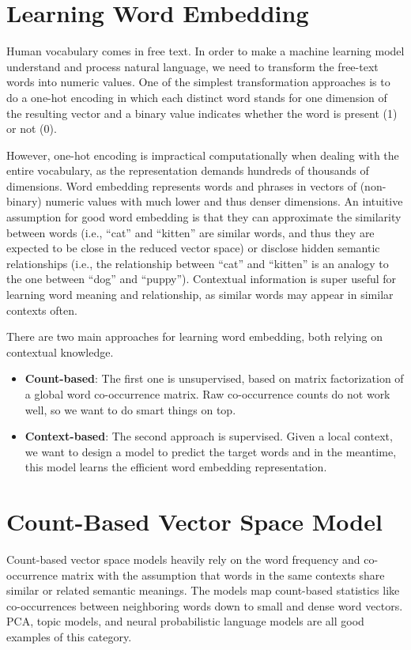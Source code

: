 \section{Learning Word Embedding}


Human vocabulary comes in free text. In order to make a machine learning model understand and process natural language, we need to transform the free-text words into numeric values. One of the simplest transformation approaches is to do a one-hot encoding in which each distinct word stands for one dimension of the resulting vector and a binary value indicates whether the word is present (1) or not (0).

However, one-hot encoding is impractical computationally when dealing with the entire vocabulary, as the representation demands hundreds of thousands of dimensions. Word embedding represents words and phrases in vectors of (non-binary) numeric values with much lower and thus denser dimensions. An intuitive assumption for good word embedding is that they can approximate the similarity between words (i.e., ``cat'' and ``kitten'' are similar words, and thus they are expected to be close in the reduced vector space) or disclose hidden semantic relationships (i.e., the relationship between ``cat'' and ``kitten'' is an analogy to the one between ``dog'' and ``puppy''). Contextual information is super useful for learning word meaning and relationship, as similar words may appear in similar contexts often.

There are two main approaches for learning word embedding, both relying on contextual knowledge.
\begin{itemize}
    \item \textbf{Count-based}: The first one is unsupervised, based on matrix factorization of a global word co-occurrence matrix. Raw co-occurrence counts do not work well, so we want to do smart things on top.
    \item \textbf{Context-based}: The second approach is supervised. Given a local context, we want to design a model to predict the target words and in the meantime, this model learns the efficient word embedding representation.
\end{itemize}

\section{Count-Based Vector Space Model}
Count-based vector space models heavily rely on the word frequency and co-occurrence matrix with the assumption that words in the same contexts share similar or related semantic meanings. The models map count-based statistics like co-occurrences between neighboring words down to small and dense word vectors. PCA, topic models, and neural probabilistic language models are all good examples of this category.

